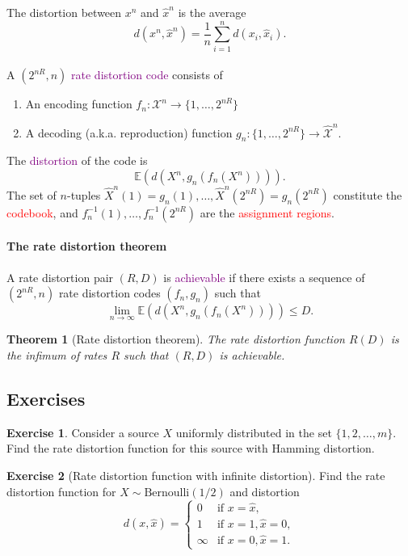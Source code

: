 \documentclass[a4paper, 11pt, openany]{book}
\numberwithin{equation}{section}
\theoremstyle{plain}
\newtheorem{theorem}	[equation]	{Theorem}
\theoremstyle{definition}
\newtheorem{exercise}   {Exercise}  [section]
\newcommand{\expectation}{\mathbb{E}}
\newcommand{\Important}[1]{\textcolor{red}{#1}}
\newcommand{\Define}[1]{\textcolor{purple}{#1}}
\newcommand{\alphabet}[1]{\mathcal{#1}}
\begin{document}
The distortion between $x^n$ and $\hat{x}^n$ is the average
$$
	d(x^n, \hat{x}^n) = \frac{1}{n} \sum_{i=1}^n d(x_i, \hat{x}_i).
$$
~\\
A $(2^{nR},n)$ \Define{rate distortion code} consists of
\begin{enumerate}
	\item An encoding function $f_n : \alphabet{X}^n \to \{1,\ldots,2^{nR}\}$
	
	\item A decoding (a.k.a. reproduction) function $g_n : \{1,\ldots,2^{nR}\} \to \hat{\alphabet{X}}^n $.
\end{enumerate}
The \Define{distortion} of the code is
$$
	\expectation \left( d(X^n, g_n(f_n(X^n))) \right).
$$
The set of $n$-tuples $\hat{X}^n(1) = g_n(1), \ldots, \hat{X}^n(2^{nR}) = g_n(2^{nR})$  constitute the \Important{codebook}, and $f_n^{-1}(1), \ldots, f_n^{-1}(2^{nR})$ are the \Important{assignment regions}.




\paragraph{The rate distortion theorem}
A rate distortion pair $(R,D)$ is \Define{achievable} if there exists a sequence of $(2^{nR},n)$ rate distortion codes $(f_n,g_n)$ such that
$$
	\lim_{n \to \infty} \expectation \left( d( X^n, g_n(f_n(X^n))) \right) \le D.
$$

\begin{theorem}[Rate distortion theorem]
The rate distortion function $R(D)$ is the infimum of rates $R$ such that $(R,D)$ is achievable.
\end{theorem}


\subsection{Exercises}


\begin{exercise}
Consider a source $X$ uniformly distributed in the set $\{1,2,\dots,m\}$. Find the rate distortion function for this source with Hamming distortion.
\end{exercise}





\begin{exercise}[Rate distortion function with infinite distortion]
Find the rate distortion function for $X \sim \text{Bernoulli}(1/2)$ and distortion
\[
	d(x, \hat{x}) = \begin{cases}
	0 &\text{if } x = \hat{x},\\
	1 &\text{if } x=1, \hat{x} = 0,\\
	\infty &\text{if } x=0, \hat{x} = 1.
	\end{cases}
\]
\end{exercise}
\end{document}
